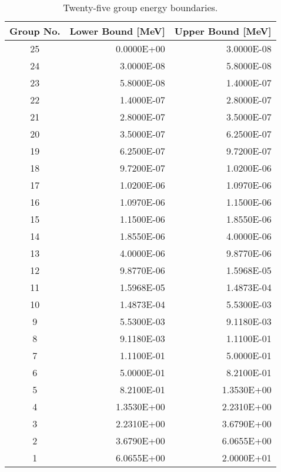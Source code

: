 \begin{appendices}
\begin{table}[h!]
  \centering
  \footnotesize
  \caption{Twenty-five group energy boundaries.}
  \label{table:app-25-groups} 
  \vspace{14pt}
  \begin{tabular}{c r r}
    \toprule
    {\bf Group No.} &
    {\bf Lower Bound [MeV]} &
    {\bf Upper Bound [MeV]} \\
    \midrule
25 & 0.0000E+00 & 3.0000E-08 \\
24 & 3.0000E-08 & 5.8000E-08 \\
23 & 5.8000E-08 & 1.4000E-07 \\
22 & 1.4000E-07 & 2.8000E-07 \\
21 & 2.8000E-07 & 3.5000E-07 \\
20 & 3.5000E-07 & 6.2500E-07 \\
19 & 6.2500E-07 & 9.7200E-07 \\
18 & 9.7200E-07 & 1.0200E-06 \\
17 & 1.0200E-06 & 1.0970E-06 \\
16 & 1.0970E-06 & 1.1500E-06 \\
15 & 1.1500E-06 & 1.8550E-06 \\
14 & 1.8550E-06 & 4.0000E-06 \\
13 & 4.0000E-06 & 9.8770E-06 \\
12 & 9.8770E-06 & 1.5968E-05 \\
11 & 1.5968E-05 & 1.4873E-04 \\
10 & 1.4873E-04 & 5.5300E-03 \\
9 & 5.5300E-03 & 9.1180E-03 \\
8 & 9.1180E-03 & 1.1100E-01 \\
7 & 1.1100E-01 & 5.0000E-01 \\
6 & 5.0000E-01 & 8.2100E-01 \\
5 & 8.2100E-01 & 1.3530E+00 \\
4 & 1.3530E+00 & 2.2310E+00 \\
3 & 2.2310E+00 & 3.6790E+00 \\
2 & 3.6790E+00 & 6.0655E+00 \\
1 & 6.0655E+00 & 2.0000E+01 \\
  \bottomrule
 \end{tabular}
\end{table}


\end{appendices}
